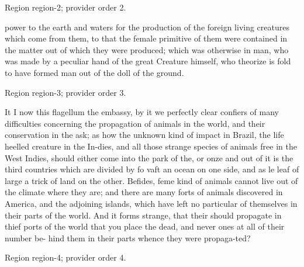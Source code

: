 \documentclass[11pt]{article}
\begin{document}
{\scriptsize\color{gray} Region region-2; provider order 2.\par}
\medskip

power to the earth and waters for the production of the foreign living creatures which come from them, to that the female primitive of them were contained in the matter out of which they were produced; which was otherwise in man, who was made by a peculiar hand of the great Creature himself, who theorize is fold to have formed man out of the doll of the ground.
\par

{\scriptsize\color{gray} Region region-3; provider order 3.\par}
\medskip

It I now this flagellum the embassy, by it we perfectly clear confiers of many difficulties concerning the propagation of animals in the world, and their conservation in the ask; as how the unknown kind of impact in Brazil, the life heelled creature in the In-dies, and all those strange species of animals free in the West Indies, should either come into the park of the, or onze and out of it is the third countries which are divided by fo vaft an ocean on one side, and as le leaf of large a trick of land on the other. Befides, feme kind of animals cannot live out of the climate where they are; and there are many forts of animals discovered in America, and the adjoining islands, which have left no particular of themselves in their parts of the world. And it forms strange, that their should propagate in thief ports of the world that you place the dead, and never ones at all of their number be- hind them in their parts whence they were propaga-ted?
\par

{\scriptsize\color{gray} Region region-4; provider order 4.\par}
\medskip
\end{document}
